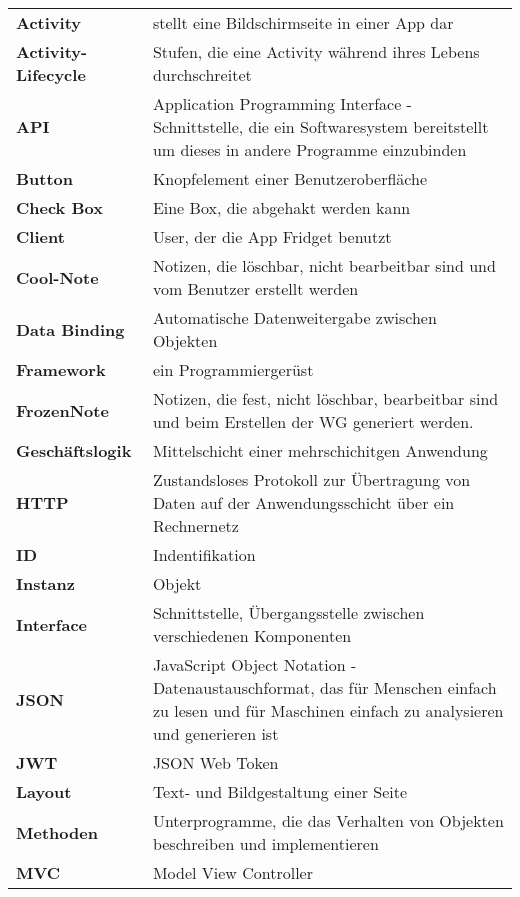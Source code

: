 \begin{table}[h!]
			\centering
			\label{my-label}
			\begin{tabular}{p{4cm}p{10cm}}
				\textbf{Activity} & stellt eine Bildschirmseite in einer App dar   \\
				\textbf{Activity-Lifecycle}& Stufen, die eine Activity während ihres Lebens durchschreitet   \\
				\textbf{API} & Application Programming Interface - Schnittstelle, die ein Softwaresystem bereitstellt um dieses in andere Programme einzubinden  \\
				\textbf{Button} & Knopfelement einer Benutzeroberfläche\\
				\textbf{Check Box} &  Eine Box, die abgehakt werden kann \\
				\textbf{Client} & User, der die App Fridget benutzt   \\
				\textbf{Cool-Note} & Notizen, die löschbar, nicht bearbeitbar sind und vom Benutzer erstellt werden   \\
				\textbf{Data Binding} & Automatische Datenweitergabe zwischen Objekten  \\
				\textbf{Framework} & ein Programmiergerüst \\
				\textbf{FrozenNote} & Notizen, die fest, nicht löschbar, bearbeitbar sind und beim Erstellen der WG generiert werden.   \\
				\textbf{Geschäftslogik} & Mittelschicht einer mehrschichitgen Anwendung  \\
				\textbf{HTTP} & Zustandsloses Protokoll zur Übertragung von Daten auf der Anwendungsschicht über ein Rechnernetz  \\
				\textbf{ID} &  Indentifikation \\	
				\textbf{Instanz} & Objekt  \\
				\textbf{Interface} & Schnittstelle, Übergangsstelle zwischen verschiedenen Komponenten  \\
				\textbf{JSON} & JavaScript Object Notation - Datenaustauschformat, das für Menschen einfach zu lesen und für Maschinen einfach zu analysieren und generieren ist   \\
				\textbf{JWT} &  JSON Web Token \\	
				\textbf{Layout} & Text- und Bildgestaltung einer Seite  \\
				\textbf{Methoden} & Unterprogramme, die das Verhalten von Objekten beschreiben und implementieren  \\
				\textbf{MVC} & Model View Controller  \\

\end{tabular}
\end{table}
